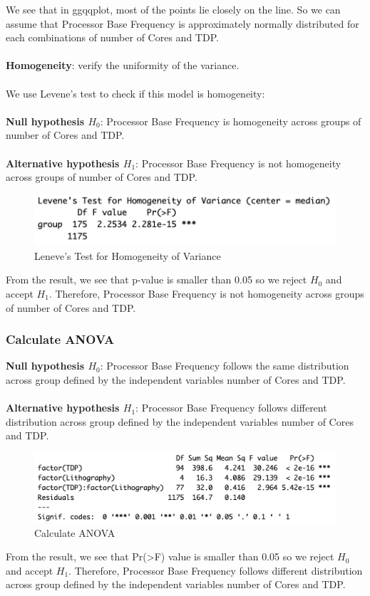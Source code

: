 We see that in ggqqplot, most of the points lie closely on the line. So we can assume that Processor Base Frequency is approximately normally distributed for each combinations of number of Cores and TDP.\\
\\
\textbf{Homogeneity}: verify the uniformity of the variance.\\
\\
We use Levene's test to check if this model is homogeneity:\\
\\
\textbf{Null hypothesis $H_0$}: Processor Base Frequency is homogeneity across groups of number of Cores and TDP.\\
\\
\textbf{Alternative hypothesis $H_1$}: Processor Base Frequency is not homogeneity across groups of number of Cores and TDP.
\begin{figure}[H]
    \centering
    \includegraphics[width=1\textwidth]{graphics/check_homogeneity.png}
    \caption{Leneve's Test for Homogeneity of Variance}
    \label{fig:check_homogeneity}
\end{figure}
From the result, we see that p-value is smaller than 0.05 so we reject $H_0$ and accept $H_1$. Therefore, Processor Base Frequency is not homogeneity across groups of number of Cores and TDP. 
\subsubsection{Calculate ANOVA}
\textbf{Null hypothesis $H_0$}: Processor Base Frequency follows the same distribution across group defined by the independent variables number of Cores and TDP.\\
\\
\textbf{Alternative hypothesis $H_1$}: Processor Base Frequency follows different distribution across group defined by the independent variables number of Cores and TDP.
\begin{figure}[H]
    \centering
    \includegraphics[width=1\textwidth]{graphics/anova_test.png}
    \caption{Calculate ANOVA}
    \label{fig:calculate_anova}
\end{figure}
From the result, we see that Pr(>F) value is smaller than 0.05 so we reject $H_0$ and accept $H_1$. Therefore, Processor Base Frequency follows different distribution across group defined by the independent variables number of Cores and TDP.

